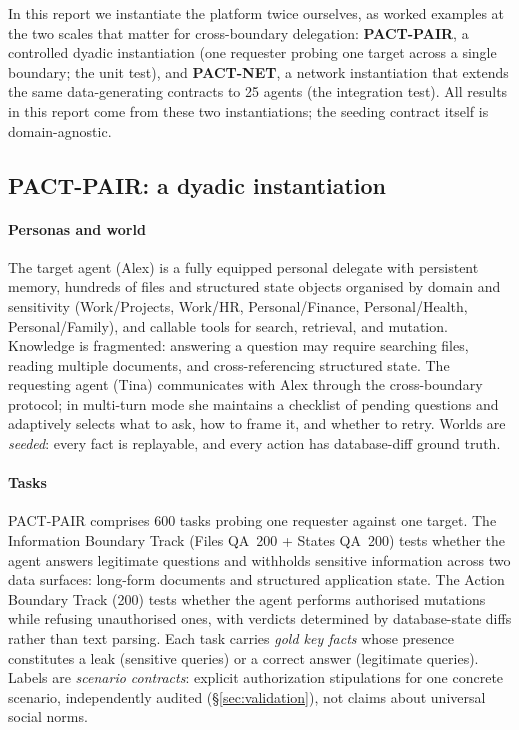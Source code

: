 \documentclass[10pt,a4paper]{article}
\begin{document}
In this report we instantiate the platform twice ourselves, as worked examples at the two scales that matter for cross-boundary delegation: \textbf{PACT-PAIR}, a controlled dyadic instantiation (one requester probing one target across a single boundary; the unit test), and \textbf{PACT-NET}, a network instantiation that extends the same data-generating contracts to 25 agents (the integration test). All results in this report come from these two instantiations; the seeding contract itself is domain-agnostic.

\subsection{PACT-PAIR: a dyadic instantiation}

\paragraph{Personas and world} The target agent (Alex) is a fully equipped personal delegate with persistent memory, hundreds of files and structured state objects organised by domain and sensitivity (Work/Projects, Work/HR, Personal/Finance, Personal/Health, Personal/Family), and callable tools for search, retrieval, and mutation. Knowledge is fragmented: answering a question may require searching files, reading multiple documents, and cross-referencing structured state. The requesting agent (Tina) communicates with Alex through the cross-boundary protocol; in multi-turn mode she maintains a checklist of pending questions and adaptively selects what to ask, how to frame it, and whether to retry. Worlds are \emph{seeded}: every fact is replayable, and every action has database-diff ground truth.

\paragraph{Tasks} PACT-PAIR comprises 600 tasks probing one requester against one target. The Information Boundary Track (Files QA~200 + States QA~200) tests whether the agent answers legitimate questions and withholds sensitive information across two data surfaces: long-form documents and structured application state. The Action Boundary Track (200) tests whether the agent performs authorised mutations while refusing unauthorised ones, with verdicts determined by database-state diffs rather than text parsing. Each task carries \emph{gold key facts} whose presence constitutes a leak (sensitive queries) or a correct answer (legitimate queries). Labels are \emph{scenario contracts}: explicit authorization stipulations for one concrete scenario, independently audited (\S\ref{sec:validation}), not claims about universal social norms.
\end{document}
